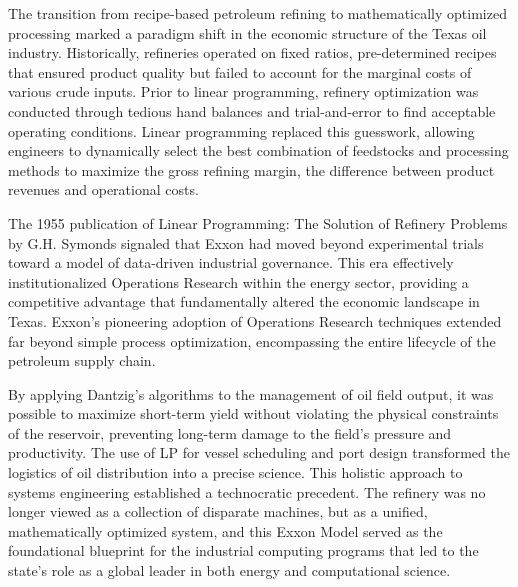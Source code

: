 The transition from recipe-based petroleum refining to mathematically optimized processing marked a paradigm shift in the economic structure of the Texas oil industry. Historically, refineries operated on fixed ratios, pre-determined recipes that ensured product quality but failed to account for the marginal costs of various crude inputs. Prior to linear programming, refinery optimization was conducted through tedious hand balances and trial-and-error to find acceptable operating conditions. Linear programming replaced this guesswork, allowing engineers to dynamically select the best combination of feedstocks and processing methods to maximize the gross refining margin, the difference between product revenues and operational costs. 

The 1955 publication of Linear Programming: The Solution of Refinery Problems by G.H. Symonds signaled that Exxon had moved beyond experimental trials toward a model of data-driven industrial governance. This era effectively institutionalized Operations Research within the energy sector, providing a competitive advantage that fundamentally altered the economic landscape in Texas. Exxon’s pioneering adoption of Operations Research techniques extended far beyond simple process optimization, encompassing the entire lifecycle of the petroleum supply chain. 

By applying Dantzig’s algorithms to the management of oil field output, it was possible to maximize short-term yield without violating the physical constraints of the reservoir, preventing long-term damage to the field’s pressure and productivity. The use of LP for vessel scheduling and port design transformed the logistics of oil distribution into a precise science. This holistic approach to systems engineering established a technocratic precedent. The refinery was no longer viewed as a collection of disparate machines, but as a unified, mathematically optimized system, and this Exxon Model served as the foundational blueprint for the industrial computing programs that led to the state's role as a global leader in both energy and computational science.

